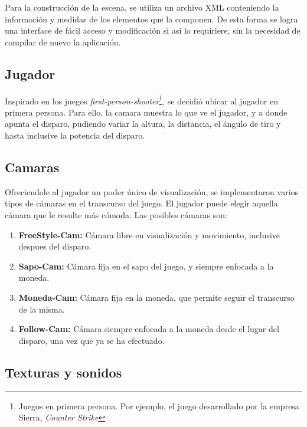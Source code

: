 \documentclass{acm_proc_article-sp}
\begin{document}
Para la construcci\'on de la escena, se utiliza un archivo XML conteniendo la informaci\'on y medidas de los elementos que la componen. De esta forma se logra una interface de f\'acil acceso y modificaci\'on si as\'i lo requiriere, sin la necesidad de compilar de nuevo la aplicaci\'on.

\subsection{Jugador}
\label{impl:jugador}

Inspirado en los juegos \textit{first-person-shooter}\footnote{Juegos en primera persona. Por ejemplo, el juego desarrollado por 
la empresa Sierra, \textit{Counter Strike}}, se decidi\'o ubicar al jugador en primera persona. Para ello, la camara muestra lo 
que ve el jugador, y a donde apunta el disparo, pudiendo variar la altura, la distancia, el \'angulo de tiro y hasta inclusive 
la potencia del disparo.

\subsection{Camaras}
\label{impl:camaras}

Ofreciendole al jugador un poder \'unico de visualizaci\'on, se implementaron varios tipos de c\'amaras en el transcurso del juego. El jugador puede elegir aquella c\'amara que le resulte m\'as c\'omoda. Las posibles c\'amaras son:

\begin{enumerate}
\item \textbf{FreeStyle-Cam:} C\'amara libre en visualizaci\'on y movimiento, inclusive despues del disparo. \\
\item \textbf{Sapo-Cam:} C\'amara fija en el sapo del juego, y siempre enfocada a la moneda. \\
\item \textbf{Moneda-Cam:} C\'amara fija en la moneda, que permite seguir el transcurso de la misma. \\
\item \textbf{Follow-Cam:} C\'amara siempre enfocada a la moneda desde el lugar del disparo, una vez que ya se ha efectuado. \\
\end{enumerate}


\subsection{Texturas y sonidos}
\end{document}
